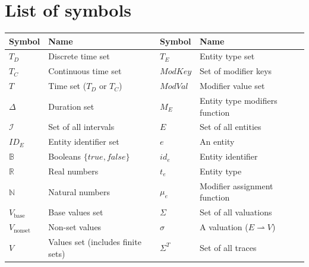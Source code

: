 \section*{List of symbols}

\begin{center}
    \begin{tabular}{ll|ll}
        \toprule
        \textbf{Symbol} & \textbf{Name} & \textbf{Symbol} & \textbf{Name} \\
        \midrule
        $T_D$                          & Discrete time set                          & $T_E$                        & Entity type set \\
        $T_C$                          & Continuous time set                        & $\mathit{ModKey}$            & Set of modifier keys \\
        $T$                            & Time set ($T_D$ or $T_C$)                  & $\mathit{ModVal}$            & Modifier value set \\
        $\Delta$                       & Duration set                               & $M_E$                        & Entity type modifiers function \\
        $\mathcal{I}$                  & Set of all intervals                       & $E$                          & Set of all entities \\
        $\mathit{ID}_E$                & Entity identifier set                      & $e$                          & An entity \\
        $\mathbb{B}$                   & Booleans $\{\mathit{true}, \mathit{false}\}$ & $id_e$                     & Entity identifier \\
        $\mathbb{R}$                   & Real numbers                               & $t_e$                        & Entity type \\
        $\mathbb{N}$                   & Natural numbers                            & $\mu_e$                      & Modifier assignment function \\
        $V_{\text{base}}$              & Base values set                            & $\Sigma$                     & Set of all valuations \\
        $V_{\text{nonset}}$            & Non-set values                             & $\sigma$                     & A valuation ($E \rightharpoonup V$) \\
        $V$                            & Values set (includes finite sets)          & $\Sigma^T$                   & Set of all traces \\

\end{tabular}
\end{center}
